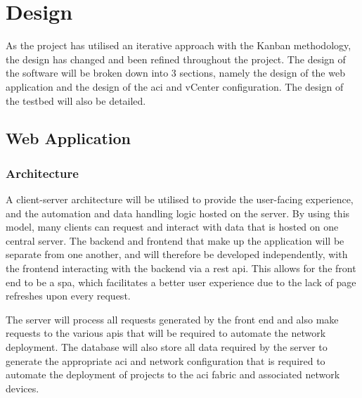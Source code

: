 \chapter{Design}
\label{chap:design}
As the project has utilised an iterative
approach with the Kanban methodology, the design has changed and been refined
throughout the project. The design of the software will be broken down into 3
sections, namely the design of the web application and the design of the \gls{aci}
and vCenter configuration.
The design of the testbed will also be detailed.

\section{Web Application}
\label{design:web-application}
\subsection{Architecture}
\label{design:web-application:architecture}

A client-server architecture will be utilised to provide the user-facing
experience, and the automation and data handling logic hosted on the server. By
using this model, many clients can request and interact with data that is
hosted on one central server. The backend and frontend that make up the
application will be separate from one another, and will therefore be developed
independently, with the frontend interacting with the backend via a \gls{rest} \gls{api}.
This allows for the front end to be a \gls{spa}, which facilitates a better user
experience due to the lack of page refreshes upon every request.

The server
will process all requests generated by the front end and also make requests to
the various \gls{api}s that will be required to automate the network deployment. The
database will also store all data required by the server to generate the
appropriate \gls{aci} and network configuration that is required to automate the deployment
of projects to the \gls{aci} fabric and associated network devices.


